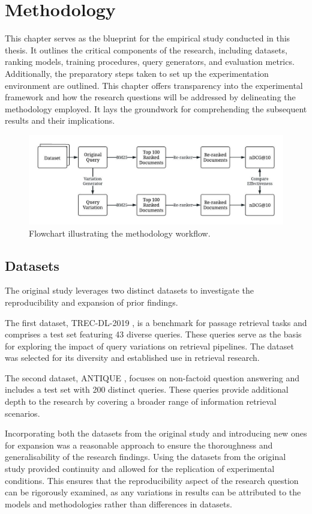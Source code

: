 \chapter{Methodology}
This chapter serves as the blueprint for the empirical study conducted in this thesis. It outlines the critical components of the research, including datasets, ranking models, training procedures, query generators, and evaluation metrics. Additionally, the preparatory steps taken to set up the experimentation environment are outlined. This chapter offers transparency into the experimental framework and how the research questions will be addressed by delineating the methodology employed. It lays the groundwork for comprehending the subsequent results and their implications.

\begin{figure}[h]
\centering
\includegraphics[width=\textwidth]{4Methodology/method.jpeg}
\caption{Flowchart illustrating the methodology workflow.}
\label{fig:method}
\end{figure}

\section{Datasets}
The original study leverages two distinct datasets to investigate the reproducibility and expansion of prior findings.

The first dataset, TREC-DL-2019 \cite{trec}, is a benchmark for passage retrieval tasks and comprises a test set featuring 43 diverse queries. These queries serve as the basis for exploring the impact of query variations on retrieval pipelines. The dataset was selected for its diversity and established use in retrieval research.

The second dataset, ANTIQUE \cite{antique}, focuses on non-factoid question answering and includes a test set with 200 distinct queries. These queries provide additional depth to the research by covering a broader range of information retrieval scenarios.

Incorporating both the datasets from the original study and introducing new ones for expansion was a reasonable approach to ensure the thoroughness and generalisability of the research findings. Using the datasets from the original study provided continuity and allowed for the replication of experimental conditions. This ensures that the reproducibility aspect of the research question can be rigorously examined, as any variations in results can be attributed to the models and methodologies rather than differences in datasets.

